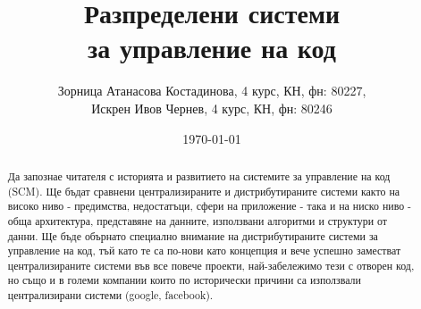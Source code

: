 \documentclass[a4paper]{article}
\begin{document}
\title{
Разпределени системи \\
за управление на код
}
\author{
Зорница Атанасова Костадинова, 4 курс, КН, фн: 80227, \\
Искрен Ивов Чернев, 4 курс, КН, фн: 80246
}
\date{\today}
\maketitle

\begin{abstract}
Да запознае читателя с историята и развитието на системите за управление на код
(SCM). Ще бъдат сравнени централизираните и дистрибутираните системи както на
високо ниво - предимства, недостатъци, сфери на приложение - така и на ниско
ниво - обща архитектура, представяне на данните, използвани алгоритми
и структури от данни. Ще бъде обърнато специално внимание на дистрибутираните
системи за управление на код, тъй като те са по-нови като концепция и вече
успешно заместват централизираните системи във все повече проекти,
най-забележимо тези с отворен код, но също и в големи компании които по
исторически причини са използвали централизирани системи (google, facebook).
\end{abstract}
\newpage

\setcounter{tocdepth}{2}
\tableofcontents
\newpage
\end{document}
